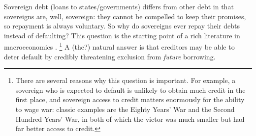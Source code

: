 \begin{example}
	\label{example:sovereign}
	Sovereign debt (loans to states/governments) differs from other debt in that sovereigns are, well, sovereign: they cannot be compelled to keep their promises, so repayment is always voluntary. So why do sovereigns ever repay their debts instead of defaulting? This question is the starting point of a rich literature in macroeconomics \parencite[see][]{AguiarAmador2021}.%
		\footnote{There are several reasons why this question is important. For example, a sovereign who is expected to default is unlikely to obtain much credit in the first place, and sovereign access to credit matters enormously for the ability to wage war: classic examples are the Eighty Years' War and the Second Hundred Years' War, in both of which the victor was much smaller but had far better access to credit.}
	A (the?) natural answer is that creditors may be able to deter default by credibly threatening exclusion from \emph{future} borrowing.


\end{example}
